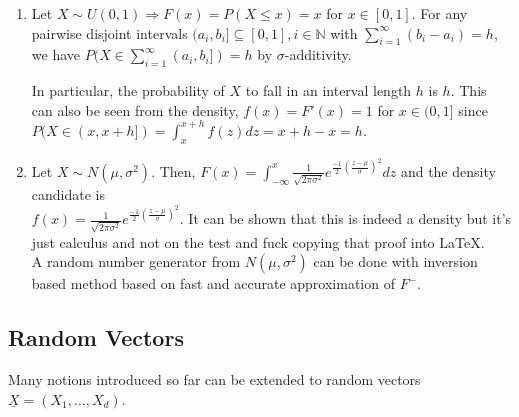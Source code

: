 \documentclass{article}
\newcommand{\N}{\mathbb{N}}
\begin{document}
	\begin{myex}{}{}
		\begin{enumerate}
			\item Let $X\sim U(0, 1)\Rightarrow F(x)=P(X\leq x)=x$ for $x\in[0, 1]$. For any pairwise disjoint intervals $(a_i, b_i]\subseteq[0, 1], i\in\N$ with $\sum_{i=1}^{\infty}(b_i-a_i)=h$, we have $P(X\in\sum_{i=1}^{\infty}(a_i, b_i])=h$ by $\sigma$-additivity.
			
			In particular, the probability of $X$ to fall in an interval length $h$ is $h$. This can also be seen from the density, $f(x)=F'(x)=1$ for $x\in(0, 1]$ since $P(X\in(x, x+h])=\int_x^{x+h}f(z)dz=x+h-x=h$.
			
			\item Let $X\sim N(\mu, \sigma^2)$. Then, $F(x)=\int_{-\infty}^x\frac{1}{\sqrt{2\pi\sigma^2}}e^{\frac{-1}{2}(\frac{z-\mu}{\sigma})^2}dz$ and the density candidate is\\
			$f(x)=\frac{1}{\sqrt{2\pi\sigma^2}}e^{\frac{-1}{2}(\frac{z-\mu}{\sigma})^2}$. It can be shown that this is indeed a density but it's just calculus and not on the test and fuck copying that proof into \LaTeX.\\
			
			A random number generator from $N(\mu, \sigma^2)$ can be done with inversion based method based on fast and accurate approximation of $F^-$.
		\end{enumerate}
	\end{myex}	
	
	\subsection{Random Vectors}
	Many notions introduced so far can be extended to random vectors $\underline{X}=(X_1, \dots, X_d)$.
	
\end{document}
